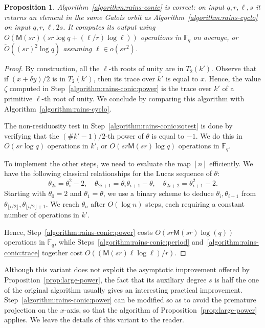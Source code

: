 \documentclass[12pt]{article}
\theoremstyle{plain}
\newtheorem{proposition}[theorem]{Proposition}
\theoremstyle{definition}
\newcommand{\tildO}{\tilde{O}}
\def\F{\ensuremath{\mathbb{F}}}
\def\MM{\ensuremath{\mathsf{M}}}
\newcounter{algorithm}
\begin{document}
\begin{proposition}
  Algorithm~\ref{algorithm:rains-conic} is correct: on input
  $q,r,\ell,s$ it returns an element in the same Galois orbit as
  Algorithm~\ref{algorithm:rains-cyclo} on input $q,r,\ell,2s$. %
  It computes its output using $O(\MM(sr)(sr\log q+(\ell/r)\log\ell))$
  operations in $\F_q$ on average, or $\tildO((sr)^2\log q)$ assuming
  $\ell\in o(sr^2)$.
\end{proposition}
\begin{proof}
  By construction, all the $\ell$-th roots of unity are in
  $T_2(k')$. %
  Observe that if $(x+\delta y)/2$ is in $T_2(k')$, then its trace
  over $k'$ is equal to $x$. %
  Hence, the value $\zeta$ computed in
  Step~\ref{algorithm:rains-conic:power} is the trace over $k'$ of a
  primitive $\ell$-th root of unity. %
  We conclude by comparing this algorithm with
  Algorithm~\ref{algorithm:rains-cyclo}.

  The non-residuosity test in Step~\ref{algorithm:rains-conic:sqtest}
  is done by verifying that the $(\#k'-1)/2$-th power of $\theta$ is
  equal to $-1$. %
  We do this in $O(sr\log q)$ operations in $k'$, or
  $O(sr\MM(sr)\log q)$ operations in $\F_q$.

  To implement the other steps, we need to evaluate the map $[n]$
  efficiently. %
  We have the following classical relationships for the Lucas sequence
  of $\theta$:
  \begin{equation*}
    \theta_{2i} = \theta_{i}^2-2,\quad
    \theta_{2i+1} = \theta_i\theta_{i+1} - \theta,\quad
    \theta_{2i+2} = \theta_{i+1}^2-2.
  \end{equation*}
  Starting with $\theta_0=2$ and $\theta_1=\theta$, we use a binary
  scheme to deduce $\theta_i,\theta_{i+1}$ from
  $\theta_{\lfloor i/2\rfloor},\theta_{\lfloor i/2\rfloor+1}$. %
  We reach $\theta_n$ after $O(\log n)$ steps, each requiring a
  constant number of operations in $k'$.

  Hence, Step~\ref{algorithm:rains-conic:power} costs
  $O(sr\MM(sr)\log(q))$ operations in $\F_q$, while
  Steps~\ref{algorithm:rains-conic:period}
  and~\ref{algorithm:rains-conic:trace} together cost
  $O((\MM(sr)\ell\log\ell)/r)$.
\end{proof}

Although this variant does not exploit the asymptotic improvement
offered by Proposition~\ref{prop:large-power}, the fact that its
auxiliary degree $s$ is half the one of the original algorithm usually
gives an interesting practical improvement. %
Step~\ref{algorithm:rains-conic:power} can be modified so as to avoid
the premature projection on the $x$-axis, so that the algorithm of
Proposition~\ref{prop:large-power} applies. %
We leave the details of this variant to the reader.
\end{document}
